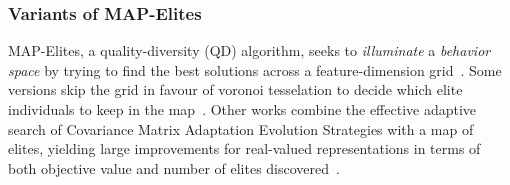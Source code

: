 
\subsubsection{Variants of MAP-Elites}
MAP-Elites, a quality-diversity (QD) algorithm, seeks to \emph{illuminate} a \emph{behavior space}
by trying to find the best solutions across a feature-dimension grid~.
Some versions skip the grid in favour of voronoi tesselation to decide which elite individuals to keep in the map~. Other works combine the effective adaptive search of Covariance Matrix Adaptation Evolution Strategies with a map of elites, yielding large improvements for real-valued representations in terms of both objective value and number of elites discovered~. 
